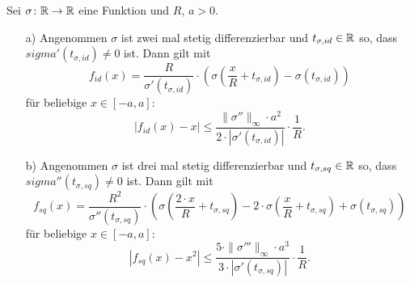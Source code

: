 \begin{lem}
  \label{lem:1}
  Sei $\sigma \colon \mathbb{R} \to \mathbb{R}$ eine Funktion und $R$, $a > 0$.
  \begin{itemize}
  \item[a)] Angenommen $\sigma$ ist zwei mal stetig differenzierbar und $t_{\sigma,id} \in \mathbb{R}$ so, dass $sigma'(t_{\sigma, id}) \neq 0$ ist. Dann gilt mit
  $$ f_{id}(x) = \frac{R}{\sigma'(t_{\sigma, id})} \cdot \left(\sigma\left(\frac{x}{R} + t_{\sigma, id}\right) - \sigma(t_{\sigma, id})\right)$$
  für beliebige $x \in [-a, a]\colon$ 
  $$ |f_{id}(x) - x| \leq \frac{\|\sigma''\|_{\infty} \cdot a^2}{2 \cdot |\sigma'(t_{\sigma, id})|} \cdot \frac{1}{R}.$$
  \item[b)] Angenommen $\sigma$ ist drei mal stetig differenzierbar und $t_{\sigma,sq} \in \mathbb{R}$ so, dass $sigma''(t_{\sigma, sq}) \neq 0$ ist. Dann gilt mit
  $$ f_{sq}(x) = \frac{R^2}{\sigma''(t_{\sigma, sq})} \cdot \left(\sigma\left(\frac{2 \cdot x}{R} + t_{\sigma, sq}\right) - 2 \cdot \sigma(\frac{x}{R} + t_{\sigma, sq})+ \sigma(t_{\sigma, sq})\right)$$
  für beliebige $x \in [-a, a]\colon$ 
  $$ |f_{sq}(x) - x^2| \leq \frac{5 \cdot \|\sigma'''\|_{\infty} \cdot a^3}{3 \cdot |\sigma'(t_{\sigma, sq})|} \cdot \frac{1}{R}.$$
  \end{itemize}
\end{lem}
